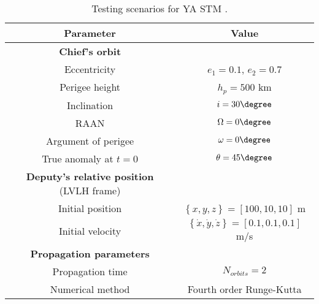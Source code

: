 \begin{table}[!htb]
\begin{center}
\begin{tabular}{|c|c|}
\hline 
\hline
\rowcolor{Gray!30}
\textbf{Parameter} & \textbf{Value} \\
\hline 
\hline 
\rowcolor{Gray!20} \textbf{Chief's orbit} &   \\
\hline
 Eccentricity & $e_1 = 0.1$, $e_2 = 0.7$ \\  
 Perigee height & $h_p = 500$ km \\ 
 Inclination & $i = 30\degree$ \\ 
 RAAN & $\Omega = 0\degree$ \\ 
 Argument of perigee & $\omega = 0\degree$ \\ 
 True anomaly at $t = 0$ & $\theta = 45\degree$ \\  
\hline 
\rowcolor{Gray!20}\textbf{Deputy's relative position} (LVLH frame) &   \\ 
\hline 
 Initial position & $\left\{ x, y, z\right\} = [100, 10, 10]$ m \\
 Initial velocity & $\left\{  \dot{x}, \dot{y}, \dot{z}\right\} = [0.1, 0.1, 0.1]$ m/s \\  
\hline 
\rowcolor{Gray!20}\textbf{Propagation parameters} &  \\ 
\hline 
 Propagation time & $N_{orbits} = 2$ \\
 Numerical method & Fourth order Runge-Kutta \\
\hline 
\end{tabular} 
\end{center}
\caption{Testing scenarios for YA STM \cite{Yamanaka_Ankersen}.}
\label{tabCh3:Scenarios_YA}
\end{table}
%
\FloatBarrier
%
